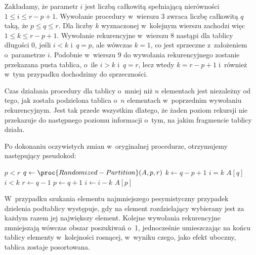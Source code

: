 
\exercise %
Zakładamy, że parametr $i$ jest liczbą całkowitą spełniającą nierówności $1\le i\le r-p+1$.
Wywołanie procedury  w~wierszu 3 zwraca liczbę całkowitą $q$ taką, że $p\le q\le r$.
Dla liczby $k$ wyznaczonej w~kolejnym wierszu zachodzi więc $1\le k\le r-p+1$.
Wywołanie rekurencyjne w~wierszu 8 nastąpi dla tablicy długości 0, jeśli $i<k$ i~$q=p$, ale wówczas $k=1$, co jest sprzeczne z~założeniem o~parametrze $i$.
Podobnie w~wierszu 9 do wywołania rekurencyjnego zostanie przekazana pusta tablica, o~ile $i>k$ i~$q=r$, lecz wtedy $k=r-p+1$ i~również w~tym przypadku dochodzimy do sprzeczności.

\exercise %
Czas działania procedury  dla tablicy o~mniej niż $n$ elementach jest niezależny od tego, jak została podzielona tablica o~$n$ elementach w~poprzednim wywołaniu rekurencyjnym.
Jest tak przede wszystkim dlatego, że żaden poziom rekursji nie przekazuje do następnego poziomu informacji o~tym, na jakim fragmencie tablicy działa.

\exercise %
Po dokonaniu oczywistych zmian w~oryginalnej procedurze, otrzymujemy następujący pseudokod:
\begin{codebox}
\li	\While $p<r$
\li		\Do $q\gets\proc{Randomized-Partition}(A,p,r)$
\li			$k\gets q-p+1$
\li			\If $i=k$
\li				\Then \Return $A[q]$
				\End
\li			\If $i<k$
\li				\Then $r\gets q-1$
\li				\Else $p\gets q+1$
\li					$i\gets i-k$
				\End
		\End
\li	\Return $A[p]$
\end{codebox}

\exercise %
W~przypadku szukania elementu najmniejszego pesymistyczny przypadek dzielenia podtablicy występuje, gdy na element rozdzielający wybierany jest za każdym razem jej największy element.
Kolejne wywołania rekurencyjne zmniejszają wówczas obszar poszukiwań o~1, jednocześnie umieszczając na końcu tablicy elementy w~kolejności rosnącej, w~wyniku czego, jako efekt uboczny, tablica zostaje posortowana.
